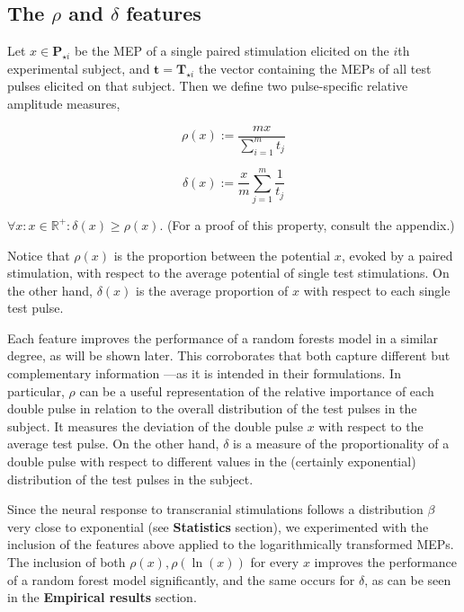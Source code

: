 \documentclass{article}
\begin{document}
\begin{multicols}{2}
\subsection{The $\rho$ and $\delta$ features}

\begin{definition} 
    Let $x \in \textbf{P}_{\star i}$ be the MEP of a single paired stimulation
    elicited on the $i$th experimental subject, and $\textbf{t} =
    \textbf{T}_{\star i}$ the vector containing the MEPs of all test pulses
    elicited on that subject. Then we define two pulse-specific relative
    amplitude measures,

    \begin{equation} 
        \rho(x) := \frac{mx}{\sum_{i=1}^mt_j}
    \end{equation}

    \begin{equation} 
        \delta(x) := \frac{x}{m}\sum_{j=1}^m\frac{1}{t_j} 
    \end{equation}
\end{definition}

\begin{remark} 
    $\forall x: x \in \mathbb{R}^+:\delta(x) \geq \rho(x)$. (For a proof of this
    property, consult the appendix.) 
\end{remark}

Notice that $\rho(x)$ is the proportion between the potential
$x$, evoked by a paired stimulation, with respect to the
average potential of single test stimulations. On the other
hand, $\delta(x)$ is the average proportion of $x$ with respect
to each single test pulse.

Each feature improves the performance of a random forests model in a similar
degree, as will be shown later. This corroborates that both capture different
but complementary information ---as it is intended in their formulations. In
particular, $\rho$ can be a useful representation of the relative importance of
each double pulse in relation to the overall distribution of the test pulses in
the subject. It measures the deviation of the double pulse $x$ with respect to
the average test pulse. On the other hand, $\delta$ is a measure of the
proportionality of a double pulse with respect to different values in the
(certainly exponential) distribution of the test pulses in the subject.

Since the neural response to transcranial stimulations follows a distribution
$\beta$ very close to exponential (see \textbf{Statistics} section), we
experimented with the inclusion of the features above applied to the
logarithmically transformed MEPs. The inclusion of both $\rho(x), \rho(\ln(x))$
for every $x$ improves the performance of a random forest model significantly,
and the same occurs for $\delta$, as can be seen in the \textbf{Empirical
results} section.


\end{multicols}
\end{document}
